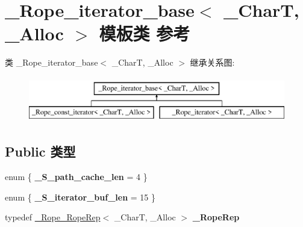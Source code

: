 \hypertarget{class___rope__iterator__base}{}\section{\+\_\+\+Rope\+\_\+iterator\+\_\+base$<$ \+\_\+\+CharT, \+\_\+\+Alloc $>$ 模板类 参考}
\label{class___rope__iterator__base}
类 \+\_\+\+Rope\+\_\+iterator\+\_\+base$<$ \+\_\+\+CharT, \+\_\+\+Alloc $>$ 继承关系图\+:\begin{figure}[H]
\begin{center}
\leavevmode
\includegraphics[height=2.000000cm]{class___rope__iterator__base}
\end{center}
\end{figure}
\subsection*{Public 类型}
\begin{DoxyCompactItemize}
\item 
\mbox{\label{class___rope__iterator__base_a63b6a171cb368196d88b17f92cb48fac}} 
enum \{ {\bfseries \+\_\+\+S\+\_\+path\+\_\+cache\+\_\+len} = 4
 \}
\item 
\mbox{\label{class___rope__iterator__base_a4dd5ae246bb8ffb087e6be6e7a63e9b7}} 
enum \{ {\bfseries \+\_\+\+S\+\_\+iterator\+\_\+buf\+\_\+len} = 15
 \}
\item 
\mbox{\label{class___rope__iterator__base_a9d077c2f0fd179bbf798743fe21a7ce4}} 
typedef \hyperlink{struct___rope___rope_rep}{\+\_\+\+Rope\+\_\+\+Rope\+Rep}$<$ \+\_\+\+CharT, \+\_\+\+Alloc $>$ {\bfseries \+\_\+\+Rope\+Rep}
\end{DoxyCompactItemize}
